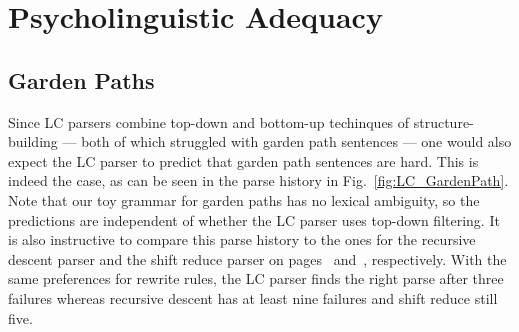\section{Psycholinguistic Adequacy}
\label{sec:LeftCorner_Evaluation}

\subsection{Garden Paths}
Since LC parsers combine top-down and bottom-up techinques of structure-building --- both of which struggled with garden path sentences --- one would also expect the LC parser to predict that garden path sentences are hard.
This is indeed the case, as can be seen in the parse history in Fig.~\ref{fig:LC_GardenPath}.
Note that our toy grammar for garden paths has no lexical ambiguity, so the predictions are independent of whether the LC parser uses top-down filtering.
It is also instructive to compare this parse history to the ones for the recursive descent parser and the shift reduce parser on pages~\pageref{fig:TopDownEval_ParseHistory} and~\pageref{fig:BottomUp_ParseHistory}, respectively.
With the same preferences for rewrite rules, the LC parser finds the right parse after three failures whereas recursive descent has at least nine failures and shift reduce still five. 
%
